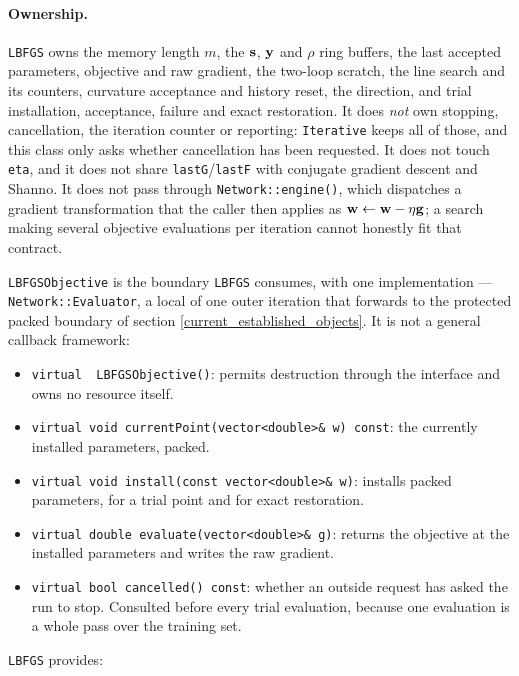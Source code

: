 \paragraph{Ownership.}  \texttt{LBFGS} owns the memory length $m$, the
${\bf s}$, ${\bf y}$ and $\rho$ ring buffers, the last accepted parameters,
objective and raw gradient, the two-loop scratch, the line search and its
counters, curvature acceptance and history reset, the direction, and trial
installation, acceptance, failure and exact restoration.  It does \emph{not}
own stopping, cancellation, the iteration counter or reporting: \texttt{Iterative}
keeps all of those, and this class only asks whether cancellation has been
requested.  It does not touch \texttt{eta}, and it does not share
\texttt{lastG}/\texttt{lastF} with conjugate gradient descent and Shanno.  It
does not pass through \texttt{Network::engine()}, which dispatches a gradient
transformation that the caller then applies as ${\bf w} \leftarrow {\bf w} -
\eta{\bf g}$; a search making several objective evaluations per iteration
cannot honestly fit that contract.

\texttt{LBFGSObjective} is the boundary \texttt{LBFGS} consumes, with one
implementation --- \texttt{Network::Evaluator}, a local of one outer iteration
that forwards to the protected packed boundary of section
\ref{current_established_objects}.  It is not a general callback framework:

\begin{itemize}
\item \texttt{virtual \string~LBFGSObjective()}: permits destruction through
      the interface and owns no resource itself.
\item \texttt{virtual void currentPoint(vector<double>\& w) const}: the
      currently installed parameters, packed.
\item \texttt{virtual void install(const vector<double>\& w)}: installs packed
      parameters, for a trial point and for exact restoration.
\item \texttt{virtual double evaluate(vector<double>\& g)}: returns the
      objective at the installed parameters and writes the raw gradient.
\item \texttt{virtual bool cancelled() const}: whether an outside request has
      asked the run to stop.  Consulted before every trial evaluation, because
      one evaluation is a whole pass over the training set.
\end{itemize}

\texttt{LBFGS} provides:


